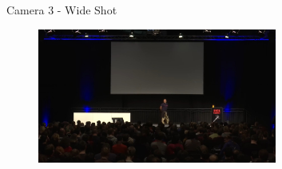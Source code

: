 \documentclass[aspectratio=169]{beamer}
\begin{document}
\begin{frame}{Camera 3 - Wide Shot}
	\begin{figure} 
		\centering
		\includegraphics[width=0.7\textwidth]{images/wide-shot.jpeg}
	\end{figure}
\end{frame}
\end{document}
